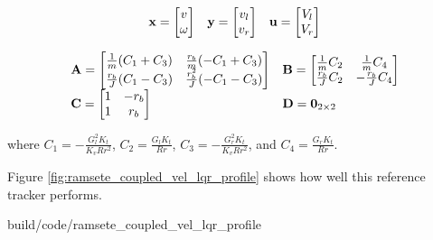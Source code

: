 \begin{theorem}
  \label{thm:ramsete_coupled_ref_tracker}
  \begin{equation*}
    \begin{array}{ccc}
      \mathbf{x} =
      \begin{bmatrix}
        v \\
        \omega
      \end{bmatrix} &
      \mathbf{y} =
      \begin{bmatrix}
        v_l \\
        v_r
      \end{bmatrix} &
      \mathbf{u} =
      \begin{bmatrix}
        V_l \\
        V_r
      \end{bmatrix}
    \end{array}
  \end{equation*}

  \begin{equation}
    \begin{array}{ll}
      \mathbf{A} =
      \begin{bmatrix}
        \frac{1}{m}(C_1 + C_3) & \frac{r_b}{m}(-C_1 + C_3) \\
        \frac{r_b}{J}(C_1 - C_3) & \frac{r_b^2}{J}(-C_1 - C_3)
      \end{bmatrix} &
      \mathbf{B} =
      \begin{bmatrix}
        \frac{1}{m}C_2 & \frac{1}{m}C_4 \\
        \frac{r_b}{J}C_2 & -\frac{r_b}{J}C_4
      \end{bmatrix} \\
      \mathbf{C} =
      \begin{bmatrix}
        1 & -r_b \\
        1 & r_b
      \end{bmatrix} &
      \mathbf{D} = \mathbf{0}_{2 \times 2}
    \end{array}
  \end{equation}

  where $C_1 = -\frac{G_l^2 K_t}{K_v R r^2}$, $C_2 = \frac{G_l K_t}{Rr}$,
  $C_3 = -\frac{G_r^2 K_t}{K_v R r^2}$, and $C_4 = \frac{G_r K_t}{Rr}$.
\end{theorem}

Figure \ref{fig:ramsete_coupled_vel_lqr_profile} shows how well this
\gls{reference} tracker performs.

\begin{svg}{build/code/ramsete_coupled_vel_lqr_profile}
  \caption{Velocity / angular velocity reference tracker response to a motion
    profile}
  \label{fig:ramsete_coupled_vel_lqr_profile}
\end{svg}

